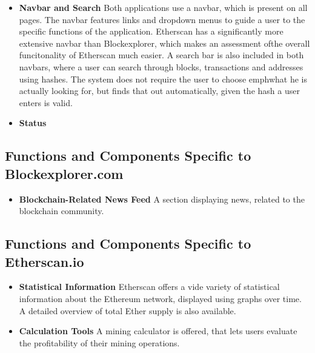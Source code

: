 \begin{itemize}
\item \textbf{Navbar and Search}
Both applications use a navbar, which is present on all pages. The navbar features links and dropdown menus to guide a user to the specific functions of the application. Etherscan has a significantly more extensive navbar than Blockexplorer, which makes an assessment ofthe overall funcitonality of Etherscan much easier. A search bar is also included in both navbars, where a user can search through blocks, transactions and addresses using hashes. The system does not require the user to choose emph{what} he is actually looking for, but finds that out automatically, given the hash a user enters is valid.
\item \textbf{Status}
\end{itemize}

\subsection{Functions and Components Specific to Blockexplorer.com}

\begin{itemize}
\item \textbf{Blockchain-Related News Feed}
A section displaying news, related to the blockchain community. 
\end{itemize}

\subsection{Functions and Components Specific to Etherscan.io}

\begin{itemize}
\item \textbf{Statistical Information}
Etherscan offers a vide variety of statistical information about the Ethereum network, displayed using graphs over time. A detailed overview of total Ether supply is also available.
\item \textbf{Calculation Tools}
A mining calculator is offered, that lets users evaluate the profitability of their mining operations. 
\end{itemize}

